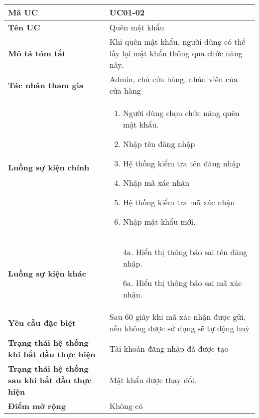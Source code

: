 \documentclass[../main.tex]{subfiles}
\begin{document}
\begin{table}[h]
\centering
\begin{tabular}{|p{4cm}|p{10cm}|}
\hline
\textbf{Mã UC} & UC01-02 \\
\hline
\textbf{Tên UC} & Quên mật khẩu \\
\hline
\textbf{Mô tả tóm tắt} & Khi quên mật khẩu, người dùng có thể lấy lại mật khẩu thông qua chức năng này. \\
\hline
\textbf{Tác nhân tham gia} & Admin, chủ cửa hàng, nhân viên của cửa hàng \\
\hline
\textbf{Luồng sự kiện chính} & 
\begin{enumerate}
    \item Người dùng chọn chức năng quên mật khẩu.
    \item Nhập tên đăng nhập
    \item Hệ thống kiểm tra tên đăng nhập
    \item Nhập mã xác nhận
    \item Hệ thống kiểm tra mã xác nhận
    \item Nhập mật khẩu mới.
\end{enumerate} \\
\hline
\textbf{Luồng sự kiện khác} & 
\begin{itemize}
    \item[4a.] Hiển thị thông báo sai tên đăng nhập.
    \item[6a.] Hiển thị thông báo sai mã xác nhận.
\end{itemize} \\
\hline
\textbf{Yêu cầu đặc biệt} & Sau 60 giây khi mã xác nhận được gửi, nếu không được sử dụng sẽ tự động huỷ \\
\hline
\textbf{Trạng thái hệ thống khi bắt đầu thực hiện} & Tài khoản đăng nhập đã được tạo \\
\hline
\textbf{Trạng thái hệ thống sau khi bắt đầu thực hiện} & Mật khẩu được thay đổi. \\
\hline
\textbf{Điểm mở rộng} & Không có \\
\hline
\end{tabular}
\end{table}
\end{document}

